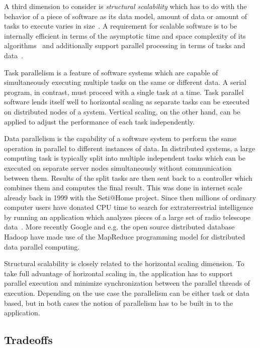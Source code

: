 \documentclass[english]{tktltiki2}
\theoremstyle{definition}
\theoremstyle{remark}
\begin{document}
A third dimension to consider is \emph{structural scalability} which has to do
with the behavior of a piece of software as its data model, amount of data or
amount of tasks to execute varies in size~\cite{handbook-scaling}. A requirement
for scalable software is to be internally efficient in terms of the asymptotic
time and space complexity of its algorithms~\cite{algorithmBook} and
additionally support parallel processing in terms of tasks and
data~\cite{foundationsOfParallelBook}.

Task parallelism is a feature of software systems which are capable of
simultaneously executing multiple tasks on the same or different data. A serial
program, in contrast, must proceed with a single task at a time. Task parallel
software lends itself well to horizontal scaling as separate tasks can be
executed on distributed nodes of a system. Vertical scaling, on the other hand,
can be applied to adjust the performance of each task independently.

Data parallelism is the capability of a software system to perform the same
operation in parallel to different instances of data. In distributed systems, a
large computing task is typically split into multiple independent tasks which
can be executed on separate server nodes simultaneously without communication
between them. Results of the split tasks are then sent back to a controller
which combines them and computes the final result. This was done in internet
scale already back in 1999 with the Seti@Home project. Since then millions of
ordinary computer users have donated CPU time to search for extraterrestrial
intelligence by running an application which analyzes pieces of a large set of
radio telescope data~\cite{Korpela2001}\cite{setiathomewebsite}. More recently
Google and e.g. the open source distributed database Hadoop have made use of the
MapReduce programming model   for distributed data
parallel computing.

Structural scalability is closely related to the horizontal scaling dimension.
To take full advantage of horizontal scaling in, the application has to support
parallel execution and minimize synchronization between the parallel threads of
execution. Depending on the use case the parallelism can be either task or data
based, but in both cases the notion of parallelism has to be built in to the
application.


\subsection{Tradeoffs}
\end{document}
